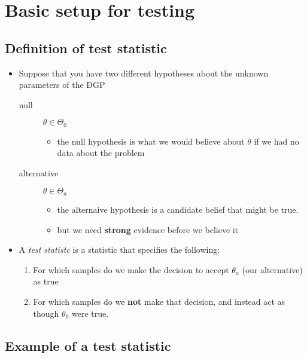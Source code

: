 \section{Basic setup for testing}

\subsection{Definition of test statistic}

\begin{itemize}
\item Suppose that you have two different hypotheses about the
       unknown parameters of the DGP
\begin{description}
\item[null] $\theta \in \Theta_0$
\begin{itemize}
\item the null hypothesis is what we would believe about $\theta$ if we
           had no data about the problem
\end{itemize}
\item[alternative] $\theta \in \Theta_a$
\begin{itemize}
\item the alternaive hypothesis is a candidate belief that might be true.
\item but we need \textbf{strong} evidence before we believe it
\end{itemize}
\end{description}
\item A \emph{test statistc} is a statistic that specifies the following:
\begin{enumerate}
\item For which samples do we make the decision to accept $\theta_a$
          (our alternative) as true
\item For which samples do we \textbf{not} make that decision, and instead
          act as though $\theta_0$ were true.
\end{enumerate}
\end{itemize}

\subsection{Example of a test statistic}


